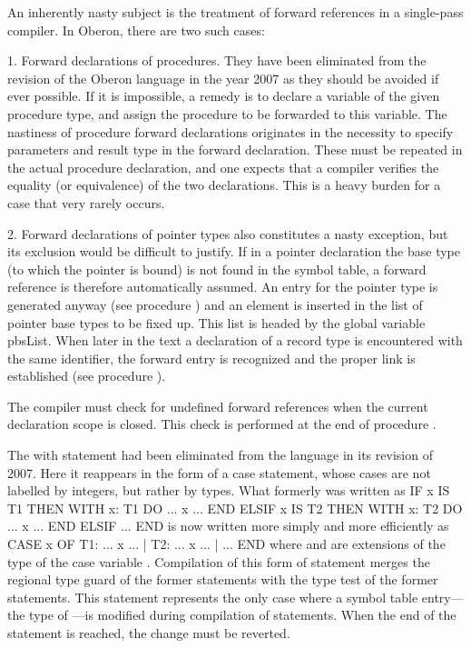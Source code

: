 \noindent An inherently nasty subject is the treatment of forward references in a single-pass compiler. In Oberon, there are two such cases:

\item{1.} Forward declarations of procedures. They have been eliminated from the revision of the Oberon language in the year 2007 as they should be avoided if ever possible. If it is impossible, a remedy is to declare a variable of the given procedure type, and assign the procedure to be forwarded to this variable. The nastiness of procedure forward declarations originates in the necessity to specify parameters and result type in the forward declaration. These must be repeated in the actual procedure declaration, and one expects that a compiler verifies the equality (or equivalence) of the two declarations. This is a heavy burden for a case that very rarely occurs.

\item{2.} Forward declarations of pointer types also constitutes a nasty exception, but its exclusion would be difficult to justify. If in a pointer declaration the base type (to which the pointer is bound) is not found in the symbol table, a forward reference is therefore automatically assumed. An entry for the pointer type is generated anyway (see procedure ) and an element is inserted in the list of pointer base types to be fixed up. This list is headed by the global variable pbsList. When later in the text a declaration of a record type is encountered with the same identifier, the forward entry is recognized and the proper link is established (see procedure ).

\noindent The compiler must check for undefined forward references when the current declaration scope is closed. This check is performed at the end of procedure .

The with statement had been eliminated from the language in its revision of 2007. Here it reappears in the form of a case statement, whose cases are not labelled by integers, but rather by types. What formerly was written as
\begintt
IF x IS T1 THEN
  WITH x: T1 DO ... x ... END
ELSIF x IS T2 THEN
  WITH x: T2 DO ... x ... END
ELSIF ... END
\endtt
is now written more simply and more efficiently as
\begintt
CASE x OF
  T1: ... x ... |
  T2: ... x ... |
  ...
END
\endtt
where  and  are extensions of the type  of the case variable . Compilation of this form of  statement merges the regional type guard of the former  statements with the type test of the former  statements. This  statement represents the only case where a symbol table entry---the type of ---is modified during compilation of statements. When the end of the  statement is reached, the change must be reverted.

